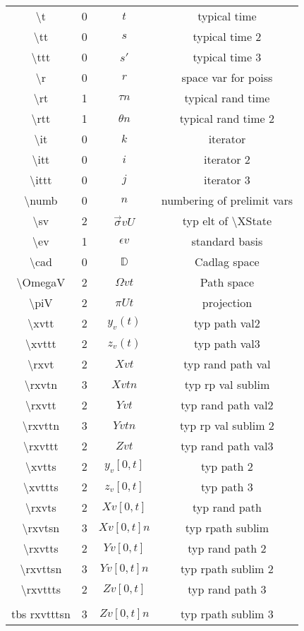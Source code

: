 \documentclass[12pt]{article}
\newcommand{\mb}{\mathbb}
\newcommand{\ep}{\epsilon}
\newcommand{\tbs}{\textbackslash}
\newcommand{\cad}{\mb{D}}							%
\renewcommand{\v}{v}							%
\renewcommand{\U}{U}							%
\renewcommand{\S}{S}							%
\newcommand{\s}{\sigma}							%
\newcommand{\sv}{\vec{\s}}						%
\newcommand{\ev}{\ep}							%
\renewcommand{\t}{t}							%
\newcommand{\proj}{\pi}							%
\renewcommand{\tt}{s}							%
\newcommand{\ttt}{s'}							%
\newcommand{\X}{X}								%
\renewcommand{\r}{r}							%
\newcommand{\XX}{Y}								%
\newcommand{\XXX}{Z}							%
\newcommand{\rt}{\tau}							%
\newcommand{\rtt}{\theta}						%
\renewcommand{\it}{k}							%
\newcommand{\xvtt}[2]{y_{#1}{(#2)}}					%
\newcommand{\xvttt}[2]{z_{#1}{(#2)}}				%
\newcommand{\xvtts}[2]{y_{#1}{#2}}					%
\newcommand{\xvttts}[2]{z_{#1}{#2}}					%
\begin{document}
\begin{longtable}{c|c|c|c}
\tbs t&0&\(\t\)								&typical time\\
\tbs tt&0&\(\tt\)								&typical time 2\\
\tbs ttt&0&\(\ttt\)							&typical time 3\\
\tbs r&0&\(\r\)								&space var for poiss\\
\tbs rt&1&\(\rt{n}\)					&typical rand time\\
\tbs rtt&1&\(\rtt{n}\)					&typical rand time 2\\
\tbs it&0& \(\it\)							&iterator\\
\tbs itt&0&\(i\)							&iterator 2\\
\tbs ittt&0&\(j\)						&iterator 3\\
\tbs numb&0&\(n\)						&numbering of prelimit vars\\
\tbs sv&2&\(\sv{\v}{\U}\)					&typ elt of \tbs XState\\
\tbs ev&1&\(\ev{\v}\)						&standard basis\\
\tbs cad&0&\(\cad\)							&Cadlag space\\
\tbs OmegaV&2&\(\Omega{\v}{\t}\)			&Path space\\
\tbs piV&2&\(\proj{\U}{t}\)					&projection\\
\tbs xvtt&2&\(\xvtt{\v}{\t}\)					&typ path val2\\
\tbs xvttt&2&\(\xvttt{\v}{\t}\)				&typ path val3\\
\tbs rxvt&2&\(\X{\v}{\t}\)					&typ rand path val\\
\tbs rxvtn&3&\(\X{\v}{\t}{n}\)		&typ rp val sublim\\
\tbs rxvtt&2&\(\XX{\v}{\t}\)				&typ rand path val2\\
\tbs rxvttn&3&\(\XX{\v}{\t}{n}\)		&typ rp val sublim 2\\
\tbs rxvttt&2&\(\XXX{\v}{\t}\)				&typ rand path val3\\
\tbs xvtts&2&\(\xvtts{\v}{[0,\t]}\)					&typ path 2\\
\tbs xvttts&2&\(\xvttts{\v}{[0,\t]}\)					&typ path 3\\
\tbs rxvts&2&\(\X{\v}{[0,\t]}\)					&typ rand path\\
\tbs rxvtsn&3&\(\X{\v}{[0,\t]}{n}\)	&typ rpath sublim\\
\tbs rxvtts&2&\(\XX{\v}{[0,\t]}\)					&typ rand path 2\\
\tbs rxvttsn&3&\(\XX{\v}{[0,\t]}{n}\)	&typ rpath sublim 2\\
\tbs rxvttts&2&\(\XXX{\v}{[0,\t]}\)				&typ rand path 3\\\\tbs rxvtttsn&3&\(\XXX{\v}{[0,\t]}{n}\)	&typ rpath sublim 3\\

\end{longtable}
\end{document}
